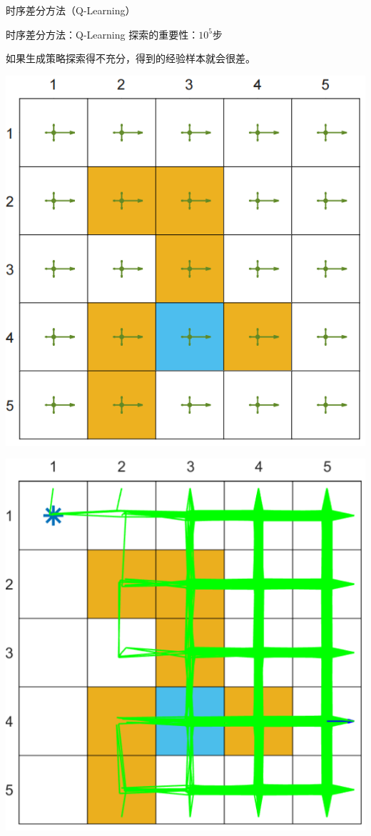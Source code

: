 \begin{section}{时序差分方法\alert{（Q-Learning）}}
\begin{frame}{时序差分方法：Q-Learning}
    探索的重要性：$10^5$步

    如果生成策略探索得不充分，得到的经验样本就会很差。
    \begin{center}
        \begin{minipage}{0.2\textwidth}
            \centering
            \includegraphics[width=\linewidth]{assets/e0.5policy.jpg}
        \end{minipage}
        \hspace{1cm}
        \begin{minipage}{0.2\textwidth}
            \centering
            \includegraphics[width=\linewidth]{assets/e0.5episode.jpg}

\end{minipage}
\end{center}
\end{frame}
\end{section}
